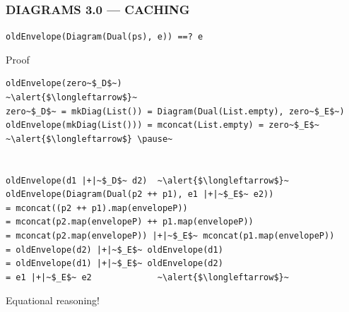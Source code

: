 \documentclass{beamer}
\begin{document}
\begin{frame}[fragile] \frametitle{DIAGRAMS 3.0 --- CACHING}
\texttt{oldEnvelope(Diagram(Dual(ps), e)) ==? e}

  \begin{block}{Proof}
\vspace{-.2cm}
  \begin{lstlisting}
oldEnvelope(zero~$_D$~)                                         ~\alert{$\longleftarrow$}~
zero~$_D$~ = mkDiag(List()) = Diagram(Dual(List.empty), zero~$_E$~)
oldEnvelope(mkDiag(List())) = mconcat(List.empty) = zero~$_E$~  ~\alert{$\longleftarrow$} \pause~


oldEnvelope(d1 |+|~$_D$~ d2)  ~\alert{$\longleftarrow$}~
oldEnvelope(Diagram(Dual(p2 ++ p1), e1 |+|~$_E$~ e2))
= mconcat((p2 ++ p1).map(envelopeP))
= mconcat(p2.map(envelopeP) ++ p1.map(envelopeP))
= mconcat(p2.map(envelopeP)) |+|~$_E$~ mconcat(p1.map(envelopeP))
= oldEnvelope(d2) |+|~$_E$~ oldEnvelope(d1)
= oldEnvelope(d1) |+|~$_E$~ oldEnvelope(d2)
= e1 |+|~$_E$~ e2             ~\alert{$\longleftarrow$}~
  \end{lstlisting}
\vspace{-.4cm}
  \end{block}

  \begin{block}{}
    \centering
    \large{Equational reasoning!}
  \end{block}
\end{frame}
\end{document}
